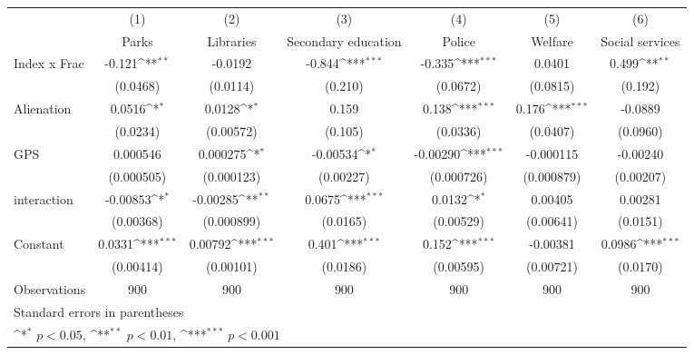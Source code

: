 {
\def\sym#1{\ifmmode^{#1}\else\(^{#1}\)\fi}
\begin{tabular}{l*{6}{c}}
\hline\hline
                    &\multicolumn{1}{c}{(1)}&\multicolumn{1}{c}{(2)}&\multicolumn{1}{c}{(3)}&\multicolumn{1}{c}{(4)}&\multicolumn{1}{c}{(5)}&\multicolumn{1}{c}{(6)}\\
                    &\multicolumn{1}{c}{Parks}&\multicolumn{1}{c}{Libraries}&\multicolumn{1}{c}{Secondary education}&\multicolumn{1}{c}{Police}&\multicolumn{1}{c}{Welfare}&\multicolumn{1}{c}{Social services}\\
\hline
Index x Frac        &      -0.121\sym{**} &     -0.0192         &      -0.844\sym{***}&      -0.335\sym{***}&      0.0401         &       0.499\sym{**} \\
                    &    (0.0468)         &    (0.0114)         &     (0.210)         &    (0.0672)         &    (0.0815)         &     (0.192)         \\
[1em]
Alienation          &      0.0516\sym{*}  &      0.0128\sym{*}  &       0.159         &       0.138\sym{***}&       0.176\sym{***}&     -0.0889         \\
                    &    (0.0234)         &   (0.00572)         &     (0.105)         &    (0.0336)         &    (0.0407)         &    (0.0960)         \\
[1em]
GPS&    0.000546         &    0.000275\sym{*}  &    -0.00534\sym{*}  &    -0.00290\sym{***}&   -0.000115         &    -0.00240         \\
                    &  (0.000505)         &  (0.000123)         &   (0.00227)         &  (0.000726)         &  (0.000879)         &   (0.00207)         \\
[1em]
interaction         &    -0.00853\sym{*}  &    -0.00285\sym{**} &      0.0675\sym{***}&      0.0132\sym{*}  &     0.00405         &     0.00281         \\
                    &   (0.00368)         &  (0.000899)         &    (0.0165)         &   (0.00529)         &   (0.00641)         &    (0.0151)         \\
[1em]
Constant            &      0.0331\sym{***}&     0.00792\sym{***}&       0.401\sym{***}&       0.152\sym{***}&    -0.00381         &      0.0986\sym{***}\\
                    &   (0.00414)         &   (0.00101)         &    (0.0186)         &   (0.00595)         &   (0.00721)         &    (0.0170)         \\
\hline
Observations        &         900         &         900         &         900         &         900         &         900         &         900         \\
\hline\hline
\multicolumn{7}{l}{\footnotesize Standard errors in parentheses}\\
\multicolumn{7}{l}{\footnotesize \sym{*} \(p<0.05\), \sym{**} \(p<0.01\), \sym{***} \(p<0.001\)}\\
\end{tabular}
}
